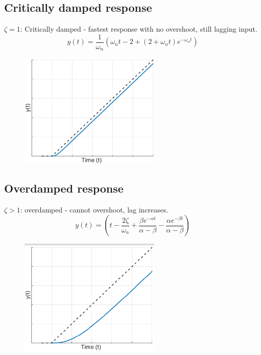 \documentclass[class=report, crop=false, 12pt,a4paper]{standalone}
\begin{document}
\subsection{Critically damped response}
$\zeta = 1$: Critically damped - fastest response with no overshoot, still lagging input.
\begin{equation}
  y(t) = \frac{1}{\omega_n} \left(\omega_n t - 2 + \left(2 + \omega_n t\right)e^{-\omega_n t}\right)
\end{equation}
\begin{figure}[H]
  \centering
  \includegraphics[width = 0.6\textwidth]{../img/diagram81.png}
\end{figure}
\subsection{Overdamped response}
$\zeta > 1$: overdamped - cannot overshoot, lag increases.
\begin{equation}
  y(t) = \left(t -\frac{2\zeta}{\omega_n} + \frac{\beta e^{-\alpha t}}{\alpha - \beta} - \frac{\alpha e^{-\beta t}}{\alpha - \beta} \right)
\end{equation}
\begin{figure}[H]
  \centering
  \includegraphics[width = 0.6\textwidth]{../img/diagram82.png}
\end{figure}
\end{document}
